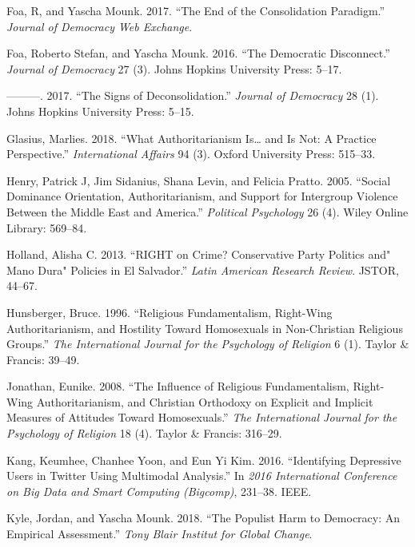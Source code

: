 \documentclass[12 pt,]{article}
\begin{document}
\leavevmode\hypertarget{ref-foa2017end}{}%
Foa, R, and Yascha Mounk. 2017. ``The End of the Consolidation
Paradigm.'' \emph{Journal of Democracy Web Exchange}.

\leavevmode\hypertarget{ref-foa2016democratic}{}%
Foa, Roberto Stefan, and Yascha Mounk. 2016. ``The Democratic
Disconnect.'' \emph{Journal of Democracy} 27 (3). Johns Hopkins
University Press: 5--17.

\leavevmode\hypertarget{ref-foa2017signs}{}%
---------. 2017. ``The Signs of Deconsolidation.'' \emph{Journal of
Democracy} 28 (1). Johns Hopkins University Press: 5--15.

\leavevmode\hypertarget{ref-glasius2018authoritarianism}{}%
Glasius, Marlies. 2018. ``What Authoritarianism Is\ldots{} and Is Not: A
Practice Perspective.'' \emph{International Affairs} 94 (3). Oxford
University Press: 515--33.

\leavevmode\hypertarget{ref-henry2005social}{}%
Henry, Patrick J, Jim Sidanius, Shana Levin, and Felicia Pratto. 2005.
``Social Dominance Orientation, Authoritarianism, and Support for
Intergroup Violence Between the Middle East and America.''
\emph{Political Psychology} 26 (4). Wiley Online Library: 569--84.

\leavevmode\hypertarget{ref-holland2013right}{}%
Holland, Alisha C. 2013. ``RIGHT on Crime? Conservative Party Politics
and" Mano Dura" Policies in El Salvador.'' \emph{Latin American Research
Review}. JSTOR, 44--67.

\leavevmode\hypertarget{ref-hunsberger1996religious}{}%
Hunsberger, Bruce. 1996. ``Religious Fundamentalism, Right-Wing
Authoritarianism, and Hostility Toward Homosexuals in Non-Christian
Religious Groups.'' \emph{The International Journal for the Psychology
of Religion} 6 (1). Taylor \& Francis: 39--49.

\leavevmode\hypertarget{ref-jonathan2008influence}{}%
Jonathan, Eunike. 2008. ``The Influence of Religious Fundamentalism,
Right-Wing Authoritarianism, and Christian Orthodoxy on Explicit and
Implicit Measures of Attitudes Toward Homosexuals.'' \emph{The
International Journal for the Psychology of Religion} 18 (4). Taylor \&
Francis: 316--29.

\leavevmode\hypertarget{ref-kang2016identifying}{}%
Kang, Keumhee, Chanhee Yoon, and Eun Yi Kim. 2016. ``Identifying
Depressive Users in Twitter Using Multimodal Analysis.'' In \emph{2016
International Conference on Big Data and Smart Computing (Bigcomp)},
231--38. IEEE.

\leavevmode\hypertarget{ref-mounk2018thepopulist}{}%
Kyle, Jordan, and Yascha Mounk. 2018. ``The Populist Harm to Democracy:
An Empirical Assessment.'' \emph{Tony Blair Institut for Global Change}.
\end{document}

